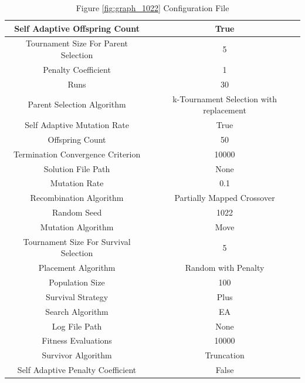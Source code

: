 \documentclass{standalone}
\begin{document}
\begin{table}[!htb]
	\centering
	\caption{Figure \ref{fig:graph_1022} Configuration File}
	\label{tab:graph_1022}
	\begin{tabular}{| c | c |}
		\hline
		Self Adaptive Offspring Count		& True		 \\
		\hline
		Tournament Size For Parent Selection		& 5		 \\
		\hline
		Penalty Coefficient		& 1		 \\
		\hline
		Runs		& 30		 \\
		\hline
		Parent Selection Algorithm		& k-Tournament Selection with replacement		 \\
		\hline
		Self Adaptive Mutation Rate		& True		 \\
		\hline
		Offspring Count		& 50		 \\
		\hline
		Termination Convergence Criterion		& 10000		 \\
		\hline
		Solution File Path		& None		 \\
		\hline
		Mutation Rate		& 0.1		 \\
		\hline
		Recombination Algorithm		& Partially Mapped Crossover		 \\
		\hline
		Random Seed		& 1022		 \\
		\hline
		Mutation Algorithm		& Move		 \\
		\hline
		Tournament Size For Survival Selection		& 5		 \\
		\hline
		Placement Algorithm		& Random with Penalty		 \\
		\hline
		Population Size		& 100		 \\
		\hline
		Survival Strategy		& Plus		 \\
		\hline
		Search Algorithm		& EA		 \\
		\hline
		Log File Path		& None		 \\
		\hline
		Fitness Evaluations		& 10000		 \\
		\hline
		Survivor Algorithm		& Truncation		 \\
		\hline
		Self Adaptive Penalty Coefficient		& False		 \\
		\hline
	\end{tabular}
\end{table}
\end{document}
